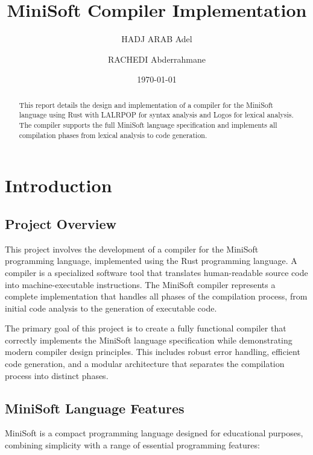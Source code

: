 \documentclass[12pt,a4paper]{article}
\begin{document}
\title{\textbf{MiniSoft Compiler Implementation}}
\author{HADJ ARAB Adel \and RACHEDI Abderrahmane}
\date{\today}
\maketitle

\begin{abstract}
	This report details the design and implementation of a compiler for the MiniSoft language using Rust with LALRPOP for syntax analysis and Logos for lexical analysis. The compiler supports the full MiniSoft language specification and implements all compilation phases from lexical analysis to code generation.
\end{abstract}

\tableofcontents
\newpage

\section{Introduction}
\subsection{Project Overview}
This project involves the development of a compiler for the MiniSoft programming language, implemented using the Rust programming language. A compiler is a specialized software tool that translates human-readable source code into machine-executable instructions. The MiniSoft compiler represents a complete implementation that handles all phases of the compilation process, from initial code analysis to the generation of executable code.

The primary goal of this project is to create a fully functional compiler that correctly implements the MiniSoft language specification while demonstrating modern compiler design principles. This includes robust error handling, efficient code generation, and a modular architecture that separates the compilation process into distinct phases.

\subsection{MiniSoft Language Features}
MiniSoft is a compact programming language designed for educational purposes, combining simplicity with a range of essential programming features:
\end{document}
